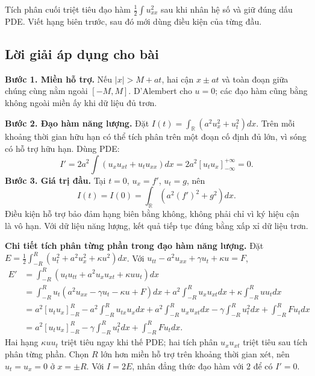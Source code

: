 \documentclass[10pt,a4paper]{article}
\begin{document}
Tích phân cuối triệt tiêu đạo hàm $\frac12\int u_{xx}^2$ sau khi nhân hệ số và giữ đúng dấu PDE. Viết hạng biên trước, sau đó mới dùng điều kiện của từng đầu.
\subsection*{Lời giải áp dụng cho bài}
\textbf{Bước 1. Miền hỗ trợ.} Nếu $|x|>M+at$, hai cận $x\pm at$ và toàn đoạn giữa chúng cùng nằm ngoài $[-M,M]$. D'Alembert cho $u=0$; các đạo hàm cũng bằng không ngoài miền ấy khi dữ liệu đủ trơn.

\textbf{Bước 2. Đạo hàm năng lượng.} Đặt $I(t)=\int_{\mathbb R}(a^2u_x^2+u_t^2)dx$. Trên mỗi khoảng thời gian hữu hạn có thể tích phân trên một đoạn cố định đủ lớn, vì sóng có hỗ trợ hữu hạn. Dùng PDE:
\[I'=2a^2\int(u_xu_{xt}+u_tu_{xx})dx=2a^2[u_tu_x]_{-\infty}^{+\infty}=0.\]
\textbf{Bước 3. Giá trị đầu.} Tại $t=0$, $u_x=f'$, $u_t=g$, nên
\[I(t)=I(0)=\int_{\mathbb R}(a^2(f')^2+g^2)dx.\]
Điều kiện hỗ trợ bảo đảm hạng biên bằng không, không phải chỉ vì ký hiệu cận là vô hạn. Với dữ liệu năng lượng, kết quả tiếp tục đúng bằng xấp xỉ dữ liệu trơn.

\textbf{Chi tiết tích phân từng phần trong đạo hàm năng lượng.} Đặt $E=\frac12\int_{-R}^R(u_t^2+a^2u_x^2+\kappa u^2)dx$. Với $u_{tt}-a^2u_{xx}+\gamma u_t+\kappa u=F$,
\[\begin{aligned}
E'&=\int_{-R}^R(u_tu_{tt}+a^2u_xu_{xt}+\kappa uu_t)dx\\
&=\int_{-R}^Ru_t(a^2u_{xx}-\gamma u_t-\kappa u+F)dx
+a^2\int_{-R}^Ru_xu_{xt}dx+\kappa\int_{-R}^Ruu_tdx\\
&=a^2[u_tu_x]_{-R}^R-a^2\int_{-R}^Ru_{tx}u_xdx
+a^2\int_{-R}^Ru_xu_{xt}dx-\gamma\int_{-R}^Ru_t^2dx+\int_{-R}^RFu_tdx\\
&=a^2[u_tu_x]_{-R}^R-\gamma\int_{-R}^Ru_t^2dx+\int_{-R}^RFu_tdx.
\end{aligned}\]
Hai hạng $\kappa uu_t$ triệt tiêu ngay khi thế PDE; hai tích phân $u_xu_{xt}$ triệt tiêu sau tích phân từng phần. Chọn $R$ lớn hơn miền hỗ trợ trên khoảng thời gian xét, nên $u_t=u_x=0$ ở $x=\pm R$. Với $I=2E$, nhân đẳng thức đạo hàm với $2$ để có $I'=0$.
\end{document}

